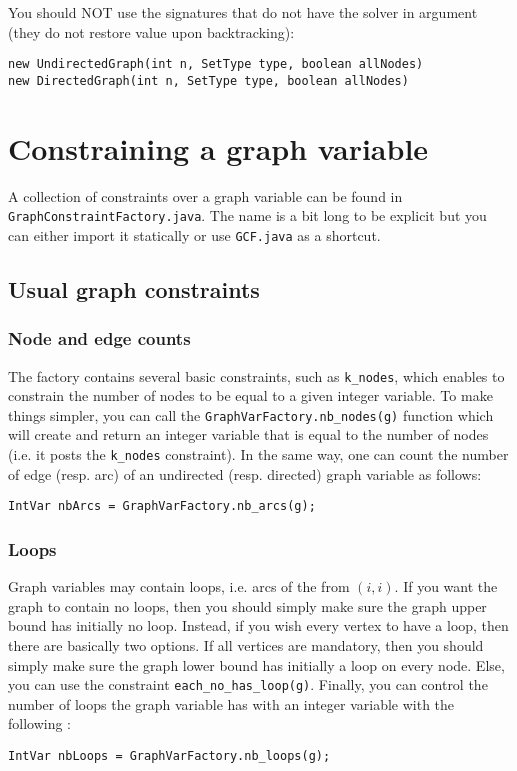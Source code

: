 \documentclass{article}
\begin{document}
You should NOT use the signatures that do not have the solver in argument (they do not restore value upon backtracking):
\begin{lstlisting}
new UndirectedGraph(int n, SetType type, boolean allNodes)
new DirectedGraph(int n, SetType type, boolean allNodes)
\end{lstlisting}

\newpage{}
\section{Constraining a graph variable}

A collection of constraints over a graph variable can be found in \texttt{GraphConstraintFactory.java}. The name is a bit long to be explicit but you can either import it statically or use \texttt{GCF.java} as a shortcut. 

\subsection{Usual graph constraints}

\subsubsection{Node and edge counts}

The factory contains several basic constraints, such as \texttt{k\_nodes}, which enables to constrain the number of nodes to be equal to a given integer variable. 
To make things simpler, you can call the \texttt{GraphVarFactory.nb\_nodes(g)} function which will create and return an integer variable that is equal to the number of nodes (i.e. it posts the \texttt{k\_nodes} constraint). 
In the same way, one can count the number of edge (resp. arc) of an undirected (resp. directed) graph variable as follows: 
\begin{lstlisting}
IntVar nbArcs = GraphVarFactory.nb_arcs(g);
\end{lstlisting}  

\subsubsection{Loops}

Graph variables may contain loops, i.e. arcs of the from $(i,i)$. If you want the graph to contain no loops, then you should simply make sure the graph upper bound has initially no loop. Instead, if you wish every vertex to have a loop, then there are basically two options. If all vertices are mandatory, then you should simply make sure the graph lower bound has initially a loop on every node. Else, you can use the constraint \texttt{each\_no\_has\_loop(g)}. Finally, you can control the number of loops the graph variable has with an integer variable with the following : 
\begin{lstlisting}
IntVar nbLoops = GraphVarFactory.nb_loops(g);
\end{lstlisting} 
\end{document}
